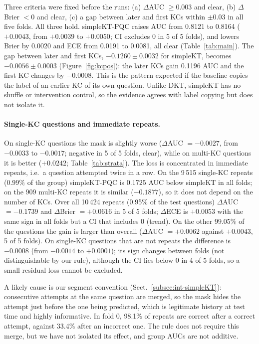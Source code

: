 Three criteria were fixed before the runs: (a) $\Delta$AUC $\ge 0.003$ and clear, (b) $\Delta$Brier $<0$ and clear, (c) a gap between later and first KCs within $\pm0.03$ in all five folds. All three hold. simpleKT-PQC raises AUC from 0.8121 to 0.8164 ($+0.0043$, from $+0.0039$ to $+0.0050$; CI excludes 0 in 5 of 5 folds), and lowers Brier by 0.0020 and ECE from 0.0191 to 0.0081, all clear (Table~\ref{tab:main}).
The gap between later and first KCs, $-0.1260\pm0.0032$ for simpleKT, becomes $-0.0056\pm0.0003$ (Figure~\ref{fig:kcpos}): the later KCs gain 0.1196 AUC and the first KC changes by $-0.0008$.
This is the pattern expected if the baseline copies the label of an earlier KC of its own question. Unlike DKT, simpleKT has no shuffle or intervention control, so the evidence agrees with label copying but does not isolate it.

\paragraph{Single-KC questions and immediate repeats.}
On single-KC questions the mask is slightly worse ($\Delta$AUC $=-0.0027$, from $-0.0033$ to $-0.0017$; negative in 5 of 5 folds, clear), while on multi-KC questions it is better ($+0.0242$; Table~\ref{tab:strata}).
The loss is concentrated in immediate repeats, i.e.\ a question attempted twice in a row. On the 9\,515 single-KC repeats ($0.99\%$ of the group) simpleKT-PQC is $0.1725$ AUC below simpleKT in all folds; on the 909 multi-KC repeats it is similar ($-0.1877$), so it does not depend on the number of KCs. Over all 10\,424 repeats (0.95\% of the test questions) $\Delta$AUC $=-0.1739$ and $\Delta$Brier $=+0.0616$ in 5 of 5 folds; $\Delta$ECE is $+0.0053$ with the same sign in all folds but a CI that includes 0 (trend).
On the other 99.05\% of the questions the gain is larger than overall ($\Delta$AUC $=+0.0062$ against $+0.0043$, 5 of 5 folds).
On single-KC questions that are not repeats the difference is $-0.0008$ (from $-0.0014$ to $+0.0001$); its sign changes between folds (not distinguishable by our rule), although the CI lies below 0 in 4 of 5 folds, so a small residual loss cannot be excluded.

A likely cause is our segment convention (Sect.~\ref{subsec:int-simpleKT}): consecutive attempts at the same question are merged, so the mask hides the attempt just before the one being predicted, which is legitimate history at test time and highly informative. In fold 0, 98.1\% of repeats are correct after a correct attempt, against 33.4\% after an incorrect one.
The rule does not require this merge, but we have not isolated its effect, and group AUCs are not additive.

\begin{table}[tbp]
  \caption{Sanity checks on fold 0 (seed 42), DKT variants. Intervention test: \texttt{inside} / \texttt{after}. Brier of a constant predictor: about 0.1626.}
  \label{tab:sanity}
  \centering
  \scriptsize
  \setlength{\tabcolsep}{3pt}
  \resizebox{\textwidth}{!}{%
  }
\end{table}
